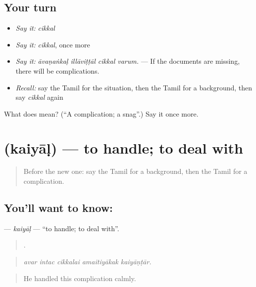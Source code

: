 \subsection*{Your turn}
\begin{itemize}
\raggedright
  \item \emph{Say it:} \emph{cikkal}
  \item \emph{Say it:} \emph{cikkal}, once more
  \item \emph{Say it:} \emph{āvaṇaṅkaḷ illāviṭṭāl cikkal varum.} — If the documents are missing, there will be complications.
  \item \emph{Recall:} say the Tamil for the situation, then the Tamil for a background, then say \emph{cikkal} again
\end{itemize}

\begin{tcolorbox}[breakable,colback=teal!4,colframe=teal!35!black,title={Before you move on}]
What does  mean? (\textquotedblleft{}A complication; a snag\textquotedblright{}.) Say it once more.
\end{tcolorbox}
\section[\texorpdfstring{\ta{கையாள்} (kaiyāḷ)}{கையாள் (kaiyāḷ)}]{ (kaiyāḷ) — to handle; to deal with}

\label{lesson:TA-C385-kaiyal}



\begin{quote}
Before the new one: say the Tamil for a background, then the Tamil for a complication.
\end{quote}

\subsection*{You'll want to know: }
\textbf{} — \emph{kaiyāḷ} — \textquotedblleft{}to handle; to deal with\textquotedblright{}.

\begin{quote}
    .
\end{quote}

\begin{quote}
\emph{avar intac cikkalai amaitiyākak kaiyāṇṭār.}
\end{quote}

\begin{quote}
He handled this complication calmly.
\end{quote}

